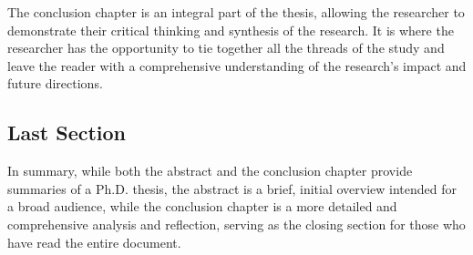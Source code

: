 The conclusion chapter is an integral part of the thesis, allowing the researcher to demonstrate their critical thinking and synthesis of the research. It is where the researcher has the opportunity to tie together all the threads of the study and leave the reader with a comprehensive understanding of the research's impact and future directions.

\subsection*{Last Section}
In summary, while both the abstract and the conclusion chapter provide summaries of a Ph.D. thesis, the abstract is a brief, initial overview intended for a broad audience, while the conclusion chapter is a more detailed and comprehensive analysis and reflection, serving as the closing section for those who have read the entire document.